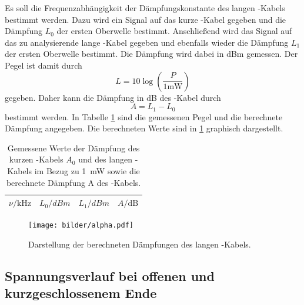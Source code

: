 Es soll die Frequenzabhängigkeit der Dämpfungskonstante des langen
\CU-Kabels bestimmt werden. %
Dazu wird ein Signal auf das kurze \CU-Kabel gegeben und die Dämpfung $L_0$
der ersten Oberwelle bestimmt.
Anschließend wird das Signal auf das zu analysierende lange
\CU-Kabel gegeben und ebenfalls wieder die Dämpfung $L_1$ der ersten Oberwelle
bestimmt.
Die Dämpfung wird dabei in \si{dBm} gemessen. Der Pegel ist damit durch
\begin{equation}
	L = 10 \log(\frac{P}{1\si{\milli\watt}})
\end{equation}
gegeben. Daher kann die Dämpfung in \si{\dB} des \CU-Kabel durch
\begin{equation}
	A = L_1 - L_0
\end{equation}
bestimmt werden. In Tabelle \ref{tab:Attenuation} sind die gemessenen Pegel und
die berechnete Dämpfung angegeben. Die berechneten Werte sind in
\ref{fig:bilder/alpha} graphisch dargestellt.

\begin{table}[hb]
  \centering
  \begin{tabular}{ccc|c}
    \midrule
    \midrule
    $\nu / \si{\kHz}$ & $L_0 / \si{dBm}$ & $L_1 / \si{dBm}$ &
    $A / \si{\dB}$ \\
    \midrule
    
    \midrule
    \midrule
  \end{tabular}
  \caption{Gemessene Werte der Dämpfung des kurzen \CU-Kabels $A_0$ und
  des langen \CU-Kabels im Bezug zu \SI{1}{\milli\watt}
  sowie die berechnete Dämpfung A des \CU-Kabels.}
  \label{tab:Attenuation}
\end{table}

\begin{figure}[ht]
	\centering
	\texttt{[image: bilder/alpha.pdf]}
	\caption{Darstellung der berechneten Dämpfungen des langen \CU-Kabels.}
\label{fig:bilder/alpha}
\end{figure}


\clearpage
\subsection{Spannungsverlauf bei offenen und kurzgeschlossenem Ende}
\label{sub:spannungsverlauf_bei_offenen_und_kurzgeschlossenem_ende}

